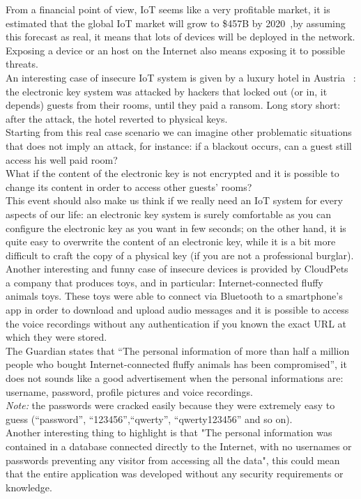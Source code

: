 	From a financial point of view, IoT seems like a very profitable market, it is estimated that the global IoT market will grow to \$457B by 2020~\cite{forbes},by assuming this forecast as real, it means that lots of devices will be deployed in the network. Exposing a device
	or an host on the Internet also means exposing it to possible threats.\\
	An interesting case of insecure IoT system is given by a luxury hotel in Austria ~\cite{whydoiot}: the electronic key system was attacked
	by hackers that locked out (or in, it depends) guests from their rooms, until they paid a ransom.
	Long story short: after the attack, the hotel reverted to physical keys.\\
	Starting from this real case scenario we can imagine other problematic situations that does not imply an attack, for instance: if a blackout occurs, can a guest still access his well paid room?\\
	What if the content of the electronic key is not encrypted and it is possible to change its content in order to access other guests' rooms?\\
	This event should also make us think if we really need an IoT system for every aspects of our life: an electronic key system is
	surely comfortable as you can configure the electronic key as you want in few seconds; on the other hand, it is quite easy to overwrite the content
	of an electronic key, while it is a bit more difficult to craft the copy of a physical key (if you are not a professional burglar).\\
	Another interesting and funny case of insecure devices is provided by CloudPets~\cite{toys} a company that produces toys, and in particular: Internet-connected fluffy animals toys.
	These toys were able to connect via Bluetooth to a smartphone's app in order to download and upload audio messages and it is possible to access the voice recordings without any authentication if you known the exact URL at which they were stored.\\
	The Guardian states that ``The personal information of more than half a million people who bought Internet-connected fluffy animals has been compromised'', it does not sounds like a good advertisement
	when the personal informations are: username, password, profile pictures and voice recordings.\\
	\emph{Note:} the passwords were cracked easily because they were extremely easy to guess (``password'', ``123456'',``qwerty'', ``qwerty123456'' and so on).\\
	Another interesting thing to highlight is that "The personal information was contained in a database connected directly to the Internet, with no usernames or passwords preventing any visitor from accessing all the data", this could mean that the entire application was developed without any security requirements or knowledge.\\
	 
